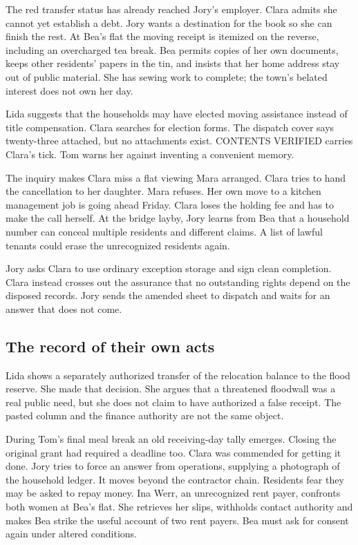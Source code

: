 The red transfer status has already reached Jory's employer. Clara admits she cannot yet establish a debt. Jory wants a destination for the book so she can finish the rest. At Bea's flat the moving receipt is itemized on the reverse, including an overcharged tea break. Bea permits copies of her own documents, keeps other residents' papers in the tin, and insists that her home address stay out of public material. She has sewing work to complete; the town's belated interest does not own her day.

Lida suggests that the households may have elected moving assistance instead of title compensation. Clara searches for election forms. The dispatch cover says twenty-three attached, but no attachments exist. CONTENTS VERIFIED carries Clara's tick. Tom warns her against inventing a convenient memory.

The inquiry makes Clara miss a flat viewing Mara arranged. Clara tries to hand the cancellation to her daughter. Mara refuses. Her own move to a kitchen management job is going ahead Friday. Clara loses the holding fee and has to make the call herself. At the bridge layby, Jory learns from Bea that a household number can conceal multiple residents and different claims. A list of lawful tenants could erase the unrecognized residents again.

Jory asks Clara to use ordinary exception storage and sign clean completion. Clara instead crosses out the assurance that no outstanding rights depend on the disposed records. Jory sends the amended sheet to dispatch and waits for an answer that does not come.

\subsection{The record of their own acts}
Lida shows a separately authorized transfer of the relocation balance to the flood reserve. She made that decision. She argues that a threatened floodwall was a real public need, but she does not claim to have authorized a false receipt. The pasted column and the finance authority are not the same object.

During Tom's final meal break an old receiving-day tally emerges. Closing the original grant had required a deadline too. Clara was commended for getting it done. Jory tries to force an answer from operations, supplying a photograph of the household ledger. It moves beyond the contractor chain. Residents fear they may be asked to repay money. Ina Werr, an unrecognized rent payer, confronts both women at Bea's flat. She retrieves her slips, withholds contact authority and makes Bea strike the useful account of two rent payers. Bea must ask for consent again under altered conditions.

